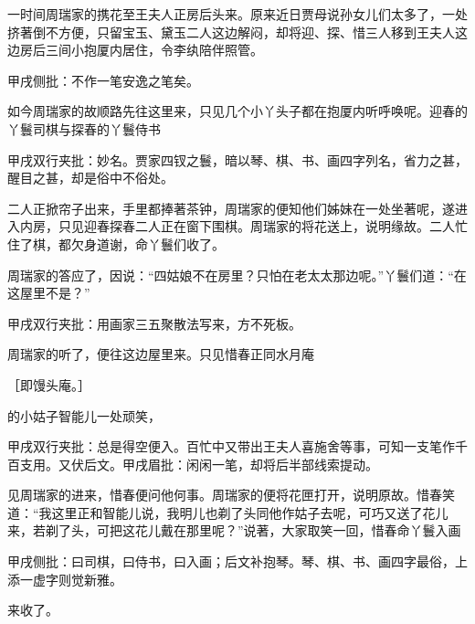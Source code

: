\begin{parag}


    一时间周瑞家的携花至王夫人正房后头来。原来近日贾母说孙女儿们太多了，一处挤著倒不方便，只留宝玉、黛玉二人这边解闷，却将迎、探、惜三人移到王夫人这边房后三间小抱厦内居住，令李纨陪伴照管。\begin{note}甲戌侧批：不作一笔安逸之笔矣。\end{note}如今周瑞家的故顺路先往这里来，只见几个小丫头子都在抱厦内听呼唤呢。迎春的丫鬟司棋与探春的丫鬟侍书\begin{note}甲戌双行夹批：妙名。贾家四钗之鬟，暗以琴、棋、书、画四字列名，省力之甚，醒目之甚，却是俗中不俗处。\end{note}二人正掀帘子出来，手里都捧著茶钟，周瑞家的便知他们姊妹在一处坐著呢，遂进入内房，只见迎春探春二人正在窗下围棋。周瑞家的将花送上，说明缘故。二人忙住了棋，都欠身道谢，命丫鬟们收了。
\end{parag}


\begin{parag}


    周瑞家的答应了，因说：“四姑娘不在房里？只怕在老太太那边呢。”丫鬟们道：“在这屋里不是？”\begin{note}甲戌双行夹批：用画家三五聚散法写来，方不死板。\end{note}周瑞家的听了，便往这边屋里来。只见惜春正同水月庵\begin{note}［即馒头庵。］\end{note}的小姑子智能儿一处顽笑，\begin{note}甲戌双行夹批：总是得空便入。百忙中又带出王夫人喜施舍等事，可知一支笔作千百支用。又伏后文。甲戌眉批：闲闲一笔，却将后半部线索提动。\end{note}见周瑞家的进来，惜春便问他何事。周瑞家的便将花匣打开，说明原故。惜春笑道：“我这里正和智能儿说，我明儿也剃了头同他作姑子去呢，可巧又送了花儿来，若剃了头，可把这花儿戴在那里呢？”说著，大家取笑一回，惜春命丫鬟入画\begin{note}甲戌侧批：曰司棋，曰侍书，曰入画；后文补抱琴。琴、棋、书、画四字最俗，上添一虚字则觉新雅。\end{note}来收了。
\end{parag}


